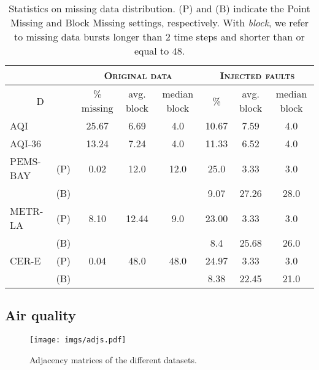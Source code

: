 \documentclass{article} \usepackage{iclr2022_conference,times}
\begin{document}
\begin{table}[ht]
\vspace{-0.2cm}
\caption{Statistics on missing data distribution. (P) and (B) indicate the Point Missing and Block Missing settings, respectively. With \emph{block}, we refer to missing data bursts longer than $2$ time steps and shorter than or equal to $48$.}
\vspace{0.1cm}
\centering  
\begin{adjustbox}{max width=\textwidth}
\begin{tabular}{ l  c |c c c | c c c}
\toprule
 \multicolumn{2}{c}{}&\multicolumn{3}{c}{\textsc{Original data}} & \multicolumn{3}{c}{\textsc{Injected faults}} \\
\midrule
\multicolumn{2}{c|}{D} & \% missing & avg. block & median block & \%  &avg. block & median block \\
\midrule
AQI & &25.67 & 6.69 & 4.0 & 10.67 & 7.59 & 4.0 \\
\midrule
AQI-36 & &13.24 & 7.24 & 4.0 & 11.33 & 6.52 & 4.0 \\
\midrule
PEMS-BAY & (P) & 0.02 & 12.0 & 12.0 & 25.0 & 3.33 & 3.0 \\
& (B) &  &  &  & 9.07 & 27.26 & 28.0 \\
\midrule
METR-LA & (P) & 8.10 & 12.44 & 9.0 & 23.00 & 3.33 & 3.0\\
& (B) &  &  &  & 8.4 & 25.68 & 26.0\\
\midrule
CER-E &(P) & 0.04 & 48.0 & 48.0 & 24.97 & 3.33 & 3.0 \\
&(B) &  &  &  & 8.38 & 22.45 & 21.0 \\
\bottomrule
\end{tabular}
\end{adjustbox}
\label{tab:missing}
\end{table} 
\subsection{Air quality} \label{a:air}

\begin{figure}
    \centering
    \texttt{[image: imgs/adjs.pdf]}
    \caption{Adjacency matrices of the different datasets.}
    \label{fig:adjs}
\end{figure}
\end{document}
